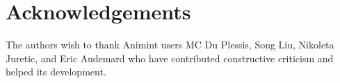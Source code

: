 \documentclass[10pt,journal,compsoc]{IEEEtran}\usepackage[]{graphicx}\usepackage[]{color}
\begin{document}
\section*{Acknowledgements}

The authors wish to thank Animint users MC Du Plessis, Song Liu,
Nikoleta Juretic, and Eric Audemard
who have contributed constructive criticism and helped its development.

%




\end{document}
